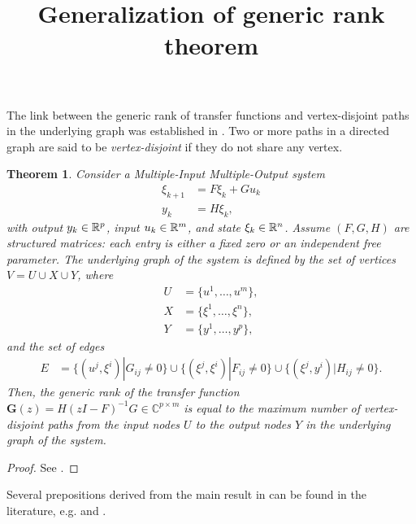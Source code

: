 \documentclass[11pt,a4paper]{article}
\title{Generalization of generic rank theorem}
\newtheorem{theorem}{Theorem}
\begin{document}
\maketitle


The link between the generic rank of transfer functions and vertex-disjoint paths in the underlying graph was established in \cite{graph_TF_rank}. Two or more paths in a directed graph are said to be \emph{vertex-disjoint} if they do not share any vertex.


\begin{theorem}\label{th:graph_TF_rank}
Consider a Multiple-Input Multiple-Output system
\begin{align*}
    \xi_{k+1} &= F\xi_{k} + Gu_k\\
    y_k &= H\xi_{k},
\end{align*}
with output $y_k\in \mathbb{R}^p$, input $u_k\in \mathbb{R}^m$, and state $\xi_k\in \mathbb{R}^n$. Assume $(F,G,H)$ are \emph{structured} matrices: each entry is either a fixed zero or an independent free parameter. The underlying graph of the system is defined by the set of vertices $V = U\cup X \cup Y$, where
\begin{align*}
    U &= \{u^1, \dots, u^m\}, \\ 
    X &= \{\xi^1, \dots, \xi^n\},\\
    Y &= \{y^1, \dots, y^p\},
\end{align*}
and the set of edges
\begin{align*}
    E &= \{(u^j,\xi^i)|G_{ij}\neq 0\} \cup \{(\xi^j,\xi^i)|F_{ij}\neq 0\}\cup \{(\xi^j,y^i)|H_{ij}\neq 0\}.
\end{align*}
Then, the generic rank of the transfer function $\mathbf{G}(z) = H(zI - F)^{-1}G \in \mathbb{C}^{p\times m}$ is equal to the maximum number of vertex-disjoint paths from the input nodes $U$ to the output nodes $Y$ in the underlying graph of the system.
\end{theorem}
\begin{proof}
   See \cite[Theorem 2]{graph_TF_rank}. 
\end{proof}


Several prepositions derived from the main result in \cite{graph_TF_rank} can be found in the literature, e.g. \cite[Proposition V.1]{HendrickGeversBazanella2019} and \cite[Proposition 1]{VandenHofRamaswamy2020}.
\end{document}
